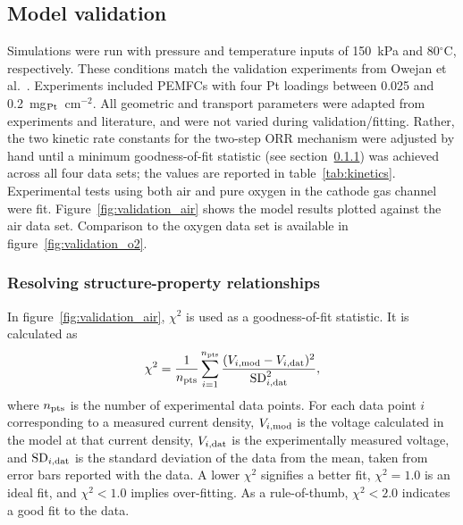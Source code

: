 \documentclass[final,3p,times,twocolumn]{elsarticle}    %
\begin{document}
\subsection{Model validation}

Simulations were run with pressure and temperature inputs of 150~kPa and 80$^{\circ}$C, respectively. These conditions match the validation experiments from Owejan et al.~\cite{bib:owejan_2013}. Experiments included PEMFCs with four Pt loadings between 0.025 and 0.2~mg$_{\rm Pt}$~cm$^{-2}$. All geometric and transport parameters were adapted from experiments and literature, and were not varied during validation/fitting. Rather, the two kinetic rate constants for the two-step ORR mechanism were adjusted by hand until a minimum goodness-of-fit statistic (see section~\ref{sec:structure_prop_results}) was achieved across all four data sets; the values are reported in table~\ref{tab:kinetics}. Experimental tests using both air and pure oxygen in the cathode gas channel were fit. Figure~\ref{fig:validation_air} shows the model results plotted against the air data set. Comparison to the oxygen data set is available in figure~\ref{fig:validation_o2}.

\subsubsection{Resolving structure-property relationships}
\label{sec:structure_prop_results}

In figure~\ref{fig:validation_air}, $\chi^2$ is used as a goodness-of-fit statistic. It is calculated as
\begin{equation}
    \chi^2 = \frac{1}{n_{\rm pts}} \sum_{i=1}^{n_{\rm pts}} 
             \frac{(V_{i,\rm mod} - V_{i,\rm dat})^2}{{\rm SD}_{i,\rm dat}^2},
\end{equation}
where $n_{\rm pts}$ is the number of experimental data points. For each data point $i$ corresponding to a measured current density, $V_{i,\rm mod}$ is the voltage calculated in the model at that current density, $V_{i,\rm dat}$ is the experimentally measured voltage, and ${\rm SD}_{i,\rm dat}$ is the standard deviation of the data from the mean, taken from error bars reported with the data. A lower $\chi^2$ signifies a better fit, $\chi^2 = 1.0$ is an ideal fit, and $\chi^2 < 1.0$ implies over-fitting. As a rule-of-thumb, $\chi^2 < 2.0$ indicates a good fit to the data. 
\end{document}
